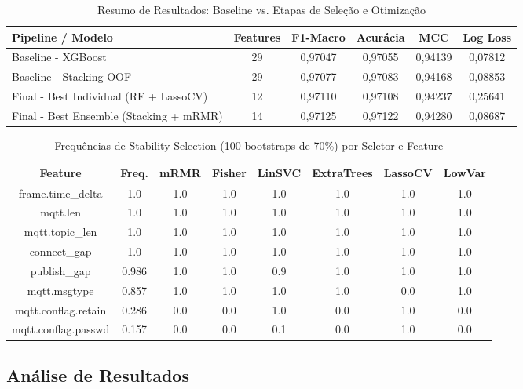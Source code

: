 \documentclass[12pt]{article}
\begin{document}
\begin{table}[h]
\centering
\footnotesize
\caption{Resumo de Resultados: Baseline vs. Etapas de Seleção e Otimização}
\label{tab:resultados_consolidado}
\begin{tabularx}{\linewidth}{|X|c|c|c|c|c|}
\hline
\textbf{Pipeline / Modelo} & \textbf{Features} & \textbf{F1-Macro} & \textbf{Acurácia} & \textbf{MCC} & \textbf{Log Loss} \\ \hline
Baseline - XGBoost & 29 & 0,97047 & 0,97055 & 0,94139 & 0,07812 \\
\hline
Baseline - Stacking OOF & 29 & 0,97077 & 0,97083 & 0,94168 & 0,08853 \\
\hline
Final - Best Individual (RF + LassoCV) & 12 & 0,97110 & 0,97108 & 0,94237 & 0,25641 \\
\hline
Final - Best Ensemble (Stacking + mRMR) & 14 & 0,97125 & 0,97122 & 0,94280 & 0,08687 \\
\hline
\end{tabularx}
\end{table}

\begin{table}[h]
\centering
\footnotesize
\caption{Frequências de Stability Selection (100 bootstraps de 70\%) por Seletor e Feature}
\label{tab:stability}
\begin{tabularx}{\linewidth}{|c|c|c|c|c|c|c|c|}
\hline
\textbf{Feature} & \textbf{Freq.} & \textbf{mRMR} & \textbf{Fisher} & \textbf{LinSVC} & \textbf{ExtraTrees} & \textbf{LassoCV} & \textbf{LowVar} \\
\hline
frame.time\_delta & 1.0 & 1.0 & 1.0 & 1.0 & 1.0 & 1.0 & 1.0 \\
mqtt.len & 1.0 & 1.0 & 1.0 & 1.0 & 1.0 & 1.0 & 1.0 \\
mqtt.topic\_len & 1.0 & 1.0 & 1.0 & 1.0 & 1.0 & 1.0 & 1.0 \\
connect\_gap & 1.0 & 1.0 & 1.0 & 1.0 & 1.0 & 1.0 & 1.0 \\
publish\_gap & 0.986 & 1.0 & 1.0 & 0.9 & 1.0 & 1.0 & 1.0 \\
mqtt.msgtype & 0.857 & 1.0 & 1.0 & 1.0 & 1.0 & 0.0 & 1.0 \\
mqtt.conflag.retain & 0.286 & 0.0 & 0.0 & 1.0 & 0.0 & 1.0 & 0.0 \\
mqtt.conflag.passwd & 0.157 & 0.0 & 0.0 & 0.1 & 0.0 & 1.0 & 0.0 \\
\hline
\end{tabularx}
\end{table}

\subsection{Análise de Resultados}
\end{document}
